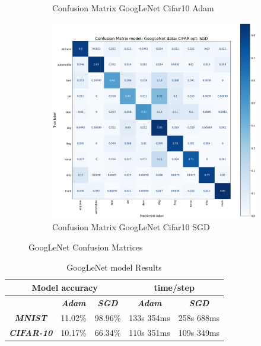 \documentclass[conference]{IEEEtran}
\begin{document}
\begin{figure}[!htbp]
\begin{subfigure}[b]{0.22\textwidth}
        \caption{Confusion Matrix GoogLeNet Cifar10 Adam}
        \label{fig:x matrix_GoogLeNet_CIFAR_Adam}
    \end{subfigure}
    \hfill
    \begin{subfigure}[b]{0.22\textwidth}
        \centering
        \includegraphics[width=\textwidth]{img/matrix_GoogLeNet_CIFAR_SGD.png}
        \caption{Confusion Matrix GoogLeNet Cifar10 SGD}
        \label{fig:x matrix_GoogLeNet_CIFAR_SGD}
    \end{subfigure}
    \caption{GoogLeNet Confusion Matrices}
    \label{fig:GoogLeNet Confusion Matrixis}
\end{figure}

\begin{table}[!htbp]
    \caption{GoogLeNet model Results}
    \begin{center}
    \begin{tabular}{|c|c|c|c|c|}
    \cline{1-5} 
    \multicolumn{3}{|c|}{\textbf{Model accuracy}} & \multicolumn{2}{|c|}{\textbf{time/step}} \\
    \hline 
    \textit{} & \textbf{\textit{Adam}} & \textbf{\textit{SGD}} & \textbf{\textit{Adam}} & \textbf{\textit{SGD}} \\
    \hline
    \textbf{\textit{MNIST}} & 11.02\% & 98.96\% & 133s 354ms & 258s 688ms \\
    \hline
    \textbf{\textit{CIFAR-10}} & 10.17\% & 66.34\% & 110s 351ms & 109s 349ms \\
    \cline{1-5} 
    \end{tabular}
    \label{tab: GoogLeNet model accuracy}
    \end{center}
\end{table}
\end{document}
